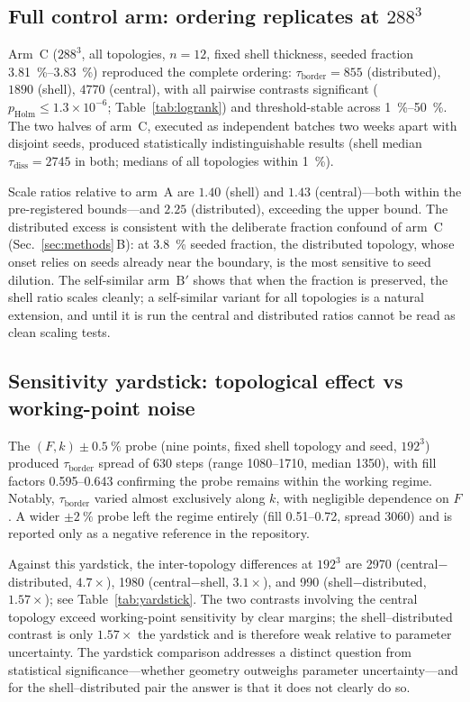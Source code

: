 \documentclass[aps,pre,preprint,superscriptaddress,nofootinbib,floatfix]{revtex4-2}
\newcommand{\tb}{\tau_{\mathrm{border}}}
\newcommand{\ti}{\tau_{\mathrm{diss}}}
\begin{document}
\subsection{Full control arm: ordering replicates at $288^3$}
\label{sec:fullc}

Arm~C ($288^3$, all topologies, $n=12$, fixed shell thickness, seeded fraction \SIrange{3.81}{3.83}{\percent}) reproduced the complete ordering: $\tb = 855$ (distributed), $1890$ (shell), $4770$ (central), with all pairwise contrasts significant ($p_{\mathrm{Holm}}\le1.3\times10^{-6}$; Table~\ref{tab:logrank}) and threshold-stable across \SIrange{1}{50}{\percent}. The two halves of arm~C, executed as independent batches two weeks apart with disjoint seeds, produced statistically indistinguishable results (shell median $\ti=2745$ in both; medians of all topologies within \SI{1}{\percent}).

Scale ratios relative to arm~A are $1.40$ (shell) and $1.43$ (central)---both within the pre-registered bounds---and $2.25$ (distributed), exceeding the upper bound. The distributed excess is consistent with the deliberate fraction confound of arm~C (Sec.~\ref{sec:methods}\,B): at \SI{3.8}{\percent} seeded fraction, the distributed topology, whose onset relies on seeds already near the boundary, is the most sensitive to seed dilution. The self-similar arm~$\mathrm{B}'$ shows that when the fraction is preserved, the shell ratio scales cleanly; a self-similar variant for all topologies is a natural extension, and until it is run the central and distributed ratios cannot be read as clean scaling tests.

\subsection{Sensitivity yardstick: topological effect vs working-point noise}

The $(F,k)\pm\SI{0.5}{\percent}$ probe (nine points, fixed shell topology and seed, $192^3$) produced $\tb$ spread of 630 steps (range \numrange{1080}{1710}, median 1350), with fill factors \numrange{0.595}{0.643} confirming the probe remains within the working regime. Notably, $\tb$ varied almost exclusively along $k$, with negligible dependence on $F$. A wider $\pm\SI{2}{\percent}$ probe left the regime entirely (fill \numrange{0.51}{0.72}, spread 3060) and is reported only as a negative reference in the repository.

Against this yardstick, the inter-topology differences at $192^3$ are 2970 (central${-}$distributed, $4.7\times$), 1980 (central${-}$shell, $3.1\times$), and 990 (shell${-}$distributed, $1.57\times$); see Table~\ref{tab:yardstick}. The two contrasts involving the central topology exceed working-point sensitivity by clear margins; the shell--distributed contrast is only $1.57\times$ the yardstick and is therefore weak relative to parameter uncertainty. The yardstick comparison addresses a distinct question from statistical significance---whether geometry outweighs parameter uncertainty---and for the shell--distributed pair the answer is that it does not clearly do so.
\end{document}
